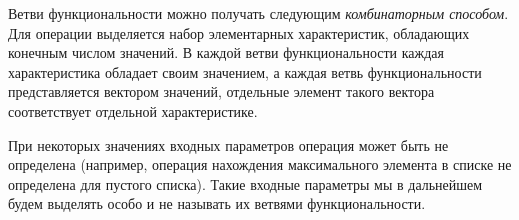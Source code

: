 \documentclass[14pt, twoside]{extreport}
\begin{document}
Ветви функциональности можно получать следующим \emph{комбинаторным способом}. Для операции выделяется набор элементарных характеристик, обладающих конечным числом значений. В каждой ветви функциональности каждая характеристика обладает своим значением, а каждая ветвь функциональности представляется вектором значений, отдельные элемент такого вектора соответствует отдельной характеристике.

При некоторых значениях входных параметров операция может быть не определена (например, операция нахождения максимального элемента в списке не определена для пустого списка). Такие входные параметры мы в дальнейшем будем выделять особо и не называть их ветвями функциональности.


%
%
%
%
\end{document}
